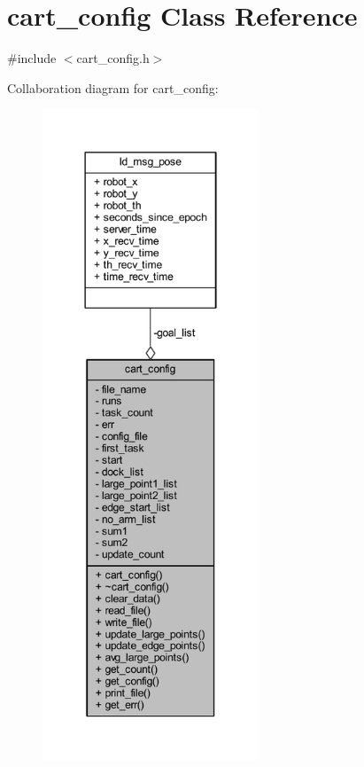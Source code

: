 \hypertarget{classcart__config}{}\section{cart\+\_\+config Class Reference}
\label{classcart__config}


{\ttfamily \#include $<$cart\+\_\+config.\+h$>$}



Collaboration diagram for cart\+\_\+config\+:
\nopagebreak
\begin{figure}[H]
\begin{center}
\leavevmode
\includegraphics[height=550pt]{classcart__config__coll__graph}
\end{center}
\end{figure}
